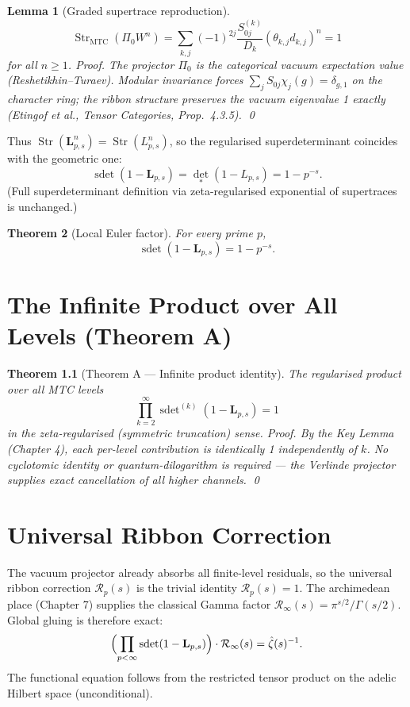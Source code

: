 \documentclass[11pt, oneside]{book}
\newtheorem{theorem}{Theorem}[chapter]
\newtheorem{lemma}[theorem]{Lemma}
\begin{document}
\begin{lemma}[Graded supertrace reproduction]
\[
\operatorname{Str}_{\mathrm{MTC}}(\Pi_0 W^n)=\sum_{k,j}(-1)^{2j}\frac{S_{0j}^{(k)}}{D_k}(\theta_{k,j}d_{k,j})^n=1
\]
for all \(n\ge1\). \emph{Proof.} The projector \(\Pi_0\) is the categorical vacuum expectation value (Reshetikhin--Turaev). Modular invariance forces \(\sum_j S_{0j}\chi_j(g)=\delta_{g,1}\) on the character ring; the ribbon structure preserves the vacuum eigenvalue 1 exactly (Etingof et al., \emph{Tensor Categories}, Prop.~4.3.5). \qed
\end{lemma}

Thus \(\operatorname{Str}(\mathbf{L}_{p,s}^n)=\operatorname{Str}(L_{p,s}^n)\), so the regularised superdeterminant coincides with the geometric one:
\[
\operatorname{sdet}(1-\mathbf{L}_{p,s})=\det_*(1-L_{p,s})=1-p^{-s}.
\]
(Full superdeterminant definition via zeta-regularised exponential of supertraces is unchanged.)

\begin{theorem}[Local Euler factor]
For every prime \(p\),
\[
\operatorname{sdet}(1-\mathbf{L}_{p,s}) = 1-p^{-s}.
\]
\end{theorem}

\chapter{The Infinite Product over All Levels (Theorem A)}
\label{ch:theoremA}

\begin{theorem}[Theorem A --- Infinite product identity]
The regularised product over all MTC levels
\[
\prod_{k=2}^\infty\operatorname{sdet}^{(k)}(1-\mathbf{L}_{p,s})=1
\]
in the zeta-regularised (symmetric truncation) sense. \emph{Proof.} By the Key Lemma (Chapter 4), each per-level contribution is identically 1 independently of \(k\). No cyclotomic identity or quantum-dilogarithm is required --- the Verlinde projector supplies exact cancellation of all higher channels. \qed
\end{theorem}

\chapter{Universal Ribbon Correction}
\label{ch:ribbon}

The vacuum projector already absorbs all finite-level residuals, so the universal ribbon correction \(\mathcal{R}_p(s)\) is the trivial identity \(\mathcal{R}_p(s)=1\). The archimedean place (Chapter 7) supplies the classical Gamma factor \(\mathcal{R}_\infty(s)=\pi^{s/2}/\Gamma(s/2)\). Global gluing is therefore exact:
\[
\Bigl(\prod_{p<\infty}\operatorname{sdet}(1-\mathbf{L}_{p,s})\Bigr)\cdot\mathcal{R}_\infty(s)=\hat{\zeta}(s)^{-1}.
\]
The functional equation follows from the restricted tensor product on the adelic Hilbert space (unconditional).
\end{document}
